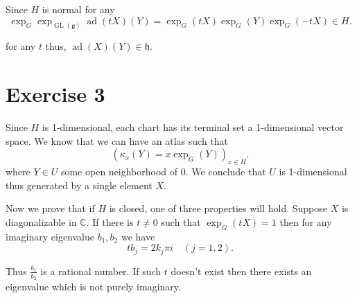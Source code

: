 \documentclass{article}
\numberwithin{equation}{section}
\DeclareMathOperator{\ad}{ad}
\DeclareMathOperator{\GL}{GL}
\begin{document}
Since $H$ is normal for any 
\begin{equation*}
\exp_G\exp_{\GL(\mathfrak{g})}\ad(tX)(Y) = \exp_G(tX)\exp_G(Y)\exp_G(-tX)\in H.
\end{equation*}

for any $t$ thus, $\ad(X)(Y)\in\mathfrak{h}$.


\section*{Exercise 3}
Since $H$ is 1-dimensional, each chart has its terminal set a 1-dimensional vector space. We know that we can have an atlas such that
\begin{equation*}
(\kappa_x(Y)=x\exp_G(Y))_{x\in H}.
\end{equation*}
where $Y\in U$ some open neighborhood of $0$. We conclude that $U$ is 1-dimensional thus generated by a single element $X$.\\
\par Now we prove that if $H$ is closed, one of three properties will hold. Suppose $X$ is diagonalizable in $\mathbb{C}$. If there is $t\not=0$ such that $\exp_G(tX)=1$ then for any imaginary eigenvalue $b_1,b_2$ we have
\begin{equation*}
tb_j = 2k_j\pi i\quad(j=1,2).
\end{equation*}

Thus ${\frac {b_1} {b_2}}$ is a rational number. If such $t$ doesn't exist then there exists an eigenvalue which is not purely imaginary. 
\end{document}
